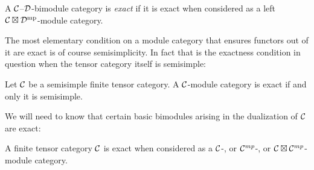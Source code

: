 \documentclass{amsart}
\begin{document}

\begin{definition}
A $\mathcal C$--$\mathcal D$-bimodule category is \emph{exact} if it is exact when considered as a left $\mathcal C \boxtimes \mathcal D^{\mathrm{mp}}$-module category.
\end{definition}

The most elementary condition on a module category that ensures functors out of it are exact is of course semisimplicity.  In fact that is the exactness condition in question when the tensor category itself is semisimple:

\begin{example} \label{eg:semiexact}
Let $\mathcal C$ be a semisimple finite tensor category.  A $\mathcal C$-module category is exact if and only it is semisimple.
\end{example}

\nid We will need to know that certain basic bimodules arising in the dualization of $\mathcal C$ are exact:

\begin{example} \label{ex:exactness}
	A finite tensor category $\mathcal C$ is exact when considered as a $\mathcal C$-, or $\mathcal C^{mp}$-, or $\mathcal C \boxtimes \mathcal C^{mp}$-module category. 
\end{example} %
\end{document}
